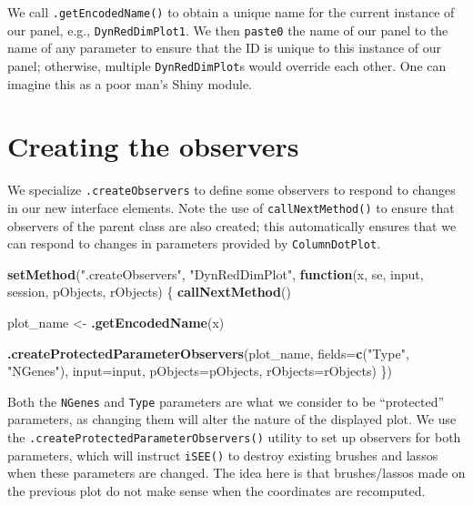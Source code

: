 \documentclass[
]{book}
\newenvironment{Shaded}{\begin{snugshade}}{\end{snugshade}}
\newcommand{\ControlFlowTok}[1]{\textcolor[rgb]{0.13,0.29,0.53}{\textbf{#1}}}
\newcommand{\DataTypeTok}[1]{\textcolor[rgb]{0.13,0.29,0.53}{#1}}
\newcommand{\KeywordTok}[1]{\textcolor[rgb]{0.13,0.29,0.53}{\textbf{#1}}}
\newcommand{\NormalTok}[1]{#1}
\newcommand{\StringTok}[1]{\textcolor[rgb]{0.31,0.60,0.02}{#1}}
\begin{document}
We call \texttt{.getEncodedName()} to obtain a unique name for the current instance of our panel, e.g., \texttt{DynRedDimPlot1}.
We then \texttt{paste0} the name of our panel to the name of any parameter to ensure that the ID is unique to this instance of our panel;
otherwise, multiple \texttt{DynRedDimPlot}s would override each other.
One can imagine this as a poor man's Shiny module.

\hypertarget{creating-the-observers}{%
\section{Creating the observers}\label{creating-the-observers}}

We specialize \texttt{.createObservers} to define some observers to respond to changes in our new interface elements.
Note the use of \texttt{callNextMethod()} to ensure that observers of the parent class are also created;
this automatically ensures that we can respond to changes in parameters provided by \texttt{ColumnDotPlot}.

\begin{Shaded}
\begin{Highlighting}[]
\KeywordTok{setMethod}\NormalTok{(}\StringTok{".createObservers"}\NormalTok{, }\StringTok{"DynRedDimPlot"}\NormalTok{, }
    \ControlFlowTok{function}\NormalTok{(x, se, input, session, pObjects, rObjects) }
\NormalTok{\{}
    \KeywordTok{callNextMethod}\NormalTok{()}

\NormalTok{    plot_name <-}\StringTok{ }\KeywordTok{.getEncodedName}\NormalTok{(x)}

    \KeywordTok{.createProtectedParameterObservers}\NormalTok{(plot_name,}
        \DataTypeTok{fields=}\KeywordTok{c}\NormalTok{(}\StringTok{"Type"}\NormalTok{, }\StringTok{"NGenes"}\NormalTok{),}
        \DataTypeTok{input=}\NormalTok{input, }\DataTypeTok{pObjects=}\NormalTok{pObjects, }\DataTypeTok{rObjects=}\NormalTok{rObjects)}
\NormalTok{\})}
\end{Highlighting}
\end{Shaded}

Both the \texttt{NGenes} and \texttt{Type} parameters are what we consider to be ``protected'' parameters,
as changing them will alter the nature of the displayed plot.
We use the \texttt{.createProtectedParameterObservers()} utility to set up observers for both parameters,
which will instruct \texttt{iSEE()} to destroy existing brushes and lassos when these parameters are changed.
The idea here is that brushes/lassos made on the previous plot do not make sense when the coordinates are recomputed.
\end{document}
